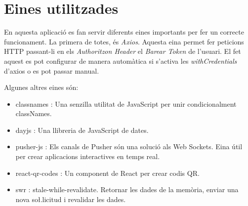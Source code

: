 \section{Eines utilitzades}

En aquesta aplicació es fan servir diferents eines importants per fer un correcte funcionament.
La primera de totes, és \emph{Axios}.
Aquesta eina permet fer peticions HTTP passant-li en els \emph{Authoritzon Header} el \emph{Barear Token} de l'usuari.
El fet aquest es pot configurar de manera automàtica si s'activa les \emph{withCredentials} d'axios o es pot passar manual.

Algunes altres eines són:
\begin{itemize}
    \item classnames \autocite{classnames}: Una senzilla utilitat de JavaScript per unir condicionalment classNames.
    \item dayjs \autocite{dayjs}: Una llibreria de JavaScript de dates.
    \item pusher-js \autocite{pusher}: Els canals de Pusher són una solució als Web Sockets.
    Eina útil per crear aplicacions interactives en temps real.
    \item react-qr-codes \autocite{react_qr_code}: Un component de React per crear codis QR.
    \item swr \autocite{swr}: stale-while-revalidate. Retornar les dades de la memòria, enviar una nova so\l.licitud
    i revalidar les dades.
\end{itemize}
